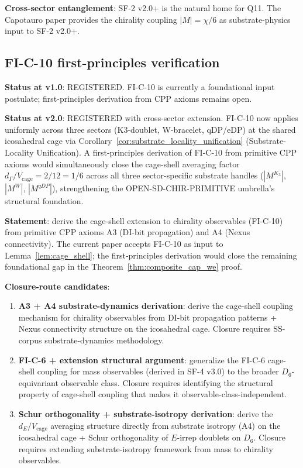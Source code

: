 \documentclass[11pt,letterpaper]{article}
\newcommand{\Kthree}{\ensuremath{K_3}}
\newcommand{\Dsix}{D_6}
\begin{document}
\textbf{Cross-sector entanglement}: SF-2 v2.0+ is the natural home for Q11. The Capotauro paper provides the chirality coupling $|M| = \chi/6$ as substrate-physics input to SF-2 v2.0+.

\subsection{FI-C-10 first-principles verification}\label{sec:open_fi_c10}

\textbf{Status at v1.0}: REGISTERED. FI-C-10 is currently a foundational input postulate; first-principles derivation from CPP axioms remains open.

\textbf{Status at v2.0}: REGISTERED with cross-sector extension. FI-C-10 now applies uniformly across three sectors (K3-doublet, W-bracelet, qDP/eDP) at the shared icosahedral cage via Corollary~\ref{cor:substrate_locality_unification} (Substrate-Locality Unification). A first-principles derivation of FI-C-10 from primitive CPP axioms would simultaneously close the cage-shell averaging factor $d_\Gamma/V_{\text{cage}} = 2/12 = 1/6$ across all three sector-specific substrate handles ($|M^{\Kthree}|$, $|M^W|$, $|M^{qDP}|$), strengthening the OPEN-SD-CHIR-PRIMITIVE umbrella's structural foundation.

\textbf{Statement}: derive the cage-shell extension to chirality observables (FI-C-10) from primitive CPP axioms A3 (DI-bit propagation) and A4 (Nexus connectivity). The current paper accepts FI-C-10 as input to Lemma~\ref{lem:cage_shell}; the first-principles derivation would close the remaining foundational gap in the Theorem~\ref{thm:composite_cap_we} proof.

\textbf{Closure-route candidates}:

\begin{enumerate}\setlength\itemsep{0.2em}
    \item \textbf{A3 + A4 substrate-dynamics derivation}: derive the cage-shell coupling mechanism for chirality observables from DI-bit propagation patterns + Nexus connectivity structure on the icosahedral cage. Closure requires SS-corpus substrate-dynamics methodology.
    \item \textbf{FI-C-6 + extension structural argument}: generalize the FI-C-6 cage-shell coupling for mass observables (derived in SF-4 v3.0) to the broader $D_6$-equivariant observable class. Closure requires identifying the structural property of cage-shell coupling that makes it observable-class-independent.
    \item \textbf{Schur orthogonality + substrate-isotropy derivation}: derive the $d_E/V_\text{cage}$ averaging structure directly from substrate isotropy (A4) on the icosahedral cage + Schur orthogonality of $E$-irrep doublets on $\Dsix$. Closure requires extending substrate-isotropy framework from mass to chirality observables.
\end{enumerate}
\end{document}
